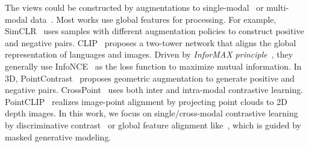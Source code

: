 \documentclass{article}
\theoremstyle{plain}
\theoremstyle{definition}
\theoremstyle{remark}
\begin{document}
The views could be constructed by augmentations to single-modal~\citep{SimCLR,MoCo,MoCoThree21} or multi-modal data~\citep{CLIP,GLIP22}.
Most works use global features for processing. 
For example, SimCLR~\citep{SimCLR} uses samples with different augmentation policies to construct positive and negative pairs. 
CLIP~\citep{CLIP} proposes a two-tower network that aligns the global representation of languages and images. 
Driven by \textit{InforMAX principle}~\citep{DeepInfoMax19}, they generally use InfoNCE~\citep{InfoNCE} as the loss function to maximize mutual information. 
In 3D, PointContrast~\citep{PointContrast20} proposes geometric augmentation to generate positive and negative pairs. 
CrossPoint~\citep{CrossPoint22} uses both inter and intra-modal contrastive learning. 
PointCLIP~\citep{PointCLIP22} realizes image-point alignment by projecting point clouds to 2D depth images. 
In this work, we focus on single/cross-modal contrastive learning by discriminative contrast~\citep{SCL20} or global feature alignment like~\citet{CLIP}, which is guided by masked generative modeling.
\end{document}
